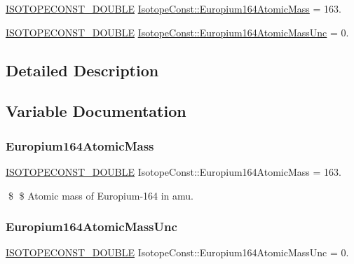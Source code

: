 \begin{DoxyCompactItemize}
\item 
\mbox{\hyperlink{group___isotope_const-_macros_ga8f45a7272ce02c0b4c65c44636ed719a}{I\+S\+O\+T\+O\+P\+E\+C\+O\+N\+S\+T\+\_\+\+D\+O\+U\+B\+LE}} \mbox{\hyperlink{group___isotope_const-_europium-_eu164_ga314c183bcaf29ba3b96f4c3292c48e7f}{Isotope\+Const\+::\+Europium164\+Atomic\+Mass}} = 163.
\item 
\mbox{\hyperlink{group___isotope_const-_macros_ga8f45a7272ce02c0b4c65c44636ed719a}{I\+S\+O\+T\+O\+P\+E\+C\+O\+N\+S\+T\+\_\+\+D\+O\+U\+B\+LE}} \mbox{\hyperlink{group___isotope_const-_europium-_eu164_gacb03d98a3a42fbfd891e177cc53e4747}{Isotope\+Const\+::\+Europium164\+Atomic\+Mass\+Unc}} = 0.
\end{DoxyCompactItemize}


\subsection{Detailed Description}


\subsection{Variable Documentation}
\mbox{\label{group___isotope_const-_europium-_eu164_ga314c183bcaf29ba3b96f4c3292c48e7f}} 
\subsubsection{\texorpdfstring{Europium164\+Atomic\+Mass}{Europium164AtomicMass}}
{\footnotesize\ttfamily \mbox{\hyperlink{group___isotope_const-_macros_ga8f45a7272ce02c0b4c65c44636ed719a}{I\+S\+O\+T\+O\+P\+E\+C\+O\+N\+S\+T\+\_\+\+D\+O\+U\+B\+LE}} Isotope\+Const\+::\+Europium164\+Atomic\+Mass = 163.}

\$ \$ Atomic mass of Europium-\/164 in amu. \mbox{\label{group___isotope_const-_europium-_eu164_gacb03d98a3a42fbfd891e177cc53e4747}} 
\subsubsection{\texorpdfstring{Europium164\+Atomic\+Mass\+Unc}{Europium164AtomicMassUnc}}
{\footnotesize\ttfamily \mbox{\hyperlink{group___isotope_const-_macros_ga8f45a7272ce02c0b4c65c44636ed719a}{I\+S\+O\+T\+O\+P\+E\+C\+O\+N\+S\+T\+\_\+\+D\+O\+U\+B\+LE}} Isotope\+Const\+::\+Europium164\+Atomic\+Mass\+Unc = 0.}

